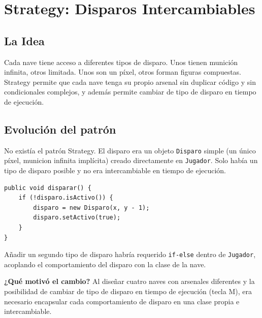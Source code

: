\documentclass[12pt, a4paper]{article}
\begin{document}
\section{Strategy: Disparos Intercambiables}
 
\subsection{La Idea}
 
Cada nave tiene acceso a diferentes tipos de disparo. Unos tienen munici\'{o}n infinita, otros limitada. Unos son un p\'{i}xel, otros forman figuras compuestas. Strategy permite que cada nave tenga su propio arsenal sin duplicar c\'{o}digo y sin condicionales complejos, y adem\'{a}s permite cambiar de tipo de disparo en tiempo de ejecuci\'{o}n.
 
\subsection{Evoluci\'{o}n del patr\'{o}n}
 
\begin{cajasprint1}
No exist\'{i}a el patr\'{o}n Strategy. El disparo era un objeto \texttt{Disparo} simple (un \'{u}nico p\'{i}xel, municion infinita impl\'{i}cita) creado directamente en \texttt{Jugador}. Solo hab\'{i}a un tipo de disparo posible y no era intercambiable en tiempo de ejecuci\'{o}n.
 
\begin{lstlisting}
public void disparar() {
    if (!disparo.isActivo()) {
        disparo = new Disparo(x, y - 1);
        disparo.setActivo(true);
    }
}
\end{lstlisting}
 
A\~{n}adir un segundo tipo de disparo habr\'{i}a requerido \texttt{if-else} dentro de \texttt{Jugador}, acoplando el comportamiento del disparo con la clase de la nave.
\end{cajasprint1}
 
\vspace{0.5em}
\textbf{¿Qu\'{e} motiv\'{o} el cambio?} Al dise\~{n}ar cuatro naves con arsenales diferentes y la posibilidad de cambiar de tipo de disparo en tiempo de ejecuci\'{o}n (tecla M), era necesario encapsular cada comportamiento de disparo en una clase propia e intercambiable.
 
\vspace{0.5em}
 
\end{document}
